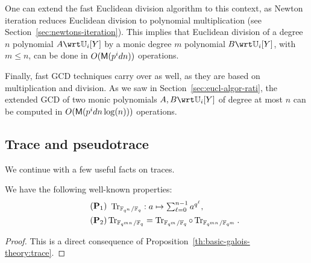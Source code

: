 One can extend the fast Euclidean division algorithm to this context,
as Newton iteration reduces Euclidean division to polynomial
multiplication (see Section~\ref{sec:newtons-iteration}). This implies
that Euclidean division of a degree $n$ polynomial $A \wrt \U_i[Y]$ by
a monic degree $m$ polynomial $B \wrt \U_i[Y]$, with $m \le n$, can be
done in $O(\mathsf{M}(p^id n))$ operations.

Finally, fast GCD techniques carry over as well, as they are based on
multiplication and division. As we saw in
Section~\ref{sec:eucl-algor-rati}, the extended GCD of two monic
polynomials $A,B \wrt \U_i[Y]$ of degree at most $n$ can be computed
in $O(\mathsf{M}(p^id n \log(n)))$ operations.


\subsection{Trace and pseudotrace}\label{ssec:tpt}


We continue with a few useful facts on traces.

\begin{proposition}
  We have the following well-known properties:
  \begin{align}
  \tag{$\mathbf{P}_1$}\label{eq:78} &\begin{array}{c}  
  \Tr_{\F_{q^n}/\F_q}: a \mapsto \sum_{\ell=0}^{n -
    1}a^{q^\ell} \text{,}
  \end{array}\\
  \tag{$\mathbf{P}_2$}\label{eq:trcomp}
  &\Tr_{\F_{q^{mn}}/\F_q} = \Tr_{\F_{q^m}/\F_q} \circ
  \Tr_{\F_{q^{mn}}/\F_{q^m}}\text{.}
\end{align}
\end{proposition}
\begin{proof}
  This is a direct consequence of
  Proposition~\ref{th:basic-galois-theory:trace}.
\end{proof}


